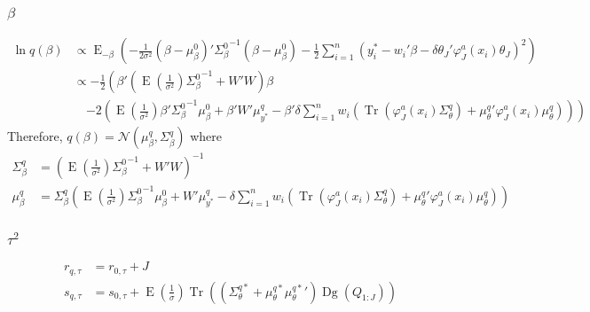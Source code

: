 \documentclass[11pt]{article}
\DeclareMathOperator{\Tr}{Tr}
\newcommand{\opn}{\operatorname}
\begin{document}
\subsubsection{$\beta$}
  \begin{align*}
    \ln q\left(\beta\right)&\propto \opn{E}_{-\beta}\left(-\frac{1}{2\sigma^{2}}\left(\beta-\mu_{\beta}^{0}\right)'{\Sigma_{\beta}^{0}}^{-1}\left(\beta-\mu_{\beta}^{0}\right)-\frac{1}{2}\sum_{i=1}^{n}\left(y_{i}^{*}-w_{i}'\beta -\delta\theta_{J}'\varphi_{J}^{a}\left(x_{i}\right)\theta_{J}\right)^{2} \right)\\
    &\propto -\frac{1}{2}\left(\beta'\left(\opn{E}\left(\frac{1}{\sigma^{2}}\right){\Sigma_{\beta}^{0}}^{-1} + W'W\right)\beta \right.\\
    &\quad  \left. -2\left(\opn{E}\left(\frac{1}{\sigma^{2}}\right)\beta'{\Sigma_{\beta}^{0}}^{-1}\mu_{\beta}^{0} +\beta'W'\mu_{y^{*}}^{q}-\beta'\delta\sum_{i=1}^{n}w_{i}\left(\Tr\left(\varphi_{J}^{a}\left(x_{i}\right)\Sigma_{\theta}^{q}\right)+{\mu_{\theta}^{q}}'\varphi_{J}^{a}\left(x_{i}\right)\mu_{\theta}^{q}\right)\right)\right)
  \end{align*}
Therefore, $q\left(\beta\right) = \mathcal{N}\left(\mu_{\beta}^{q}, \Sigma_{\beta}^{q}\right)$ where
\begin{align*}
  \Sigma_{\beta}^{q} &= \left(\opn{E}\left(\frac{1}{\sigma^{2}}\right){\Sigma_{\beta}^{0}}^{-1} + W'W\right)^{-1}\\
  \mu_{\beta}^{q} &= \Sigma_{\beta}^{q}\left(\opn{E}\left(\frac{1}{\sigma^{2}}\right) {\Sigma_{\beta}^{0}}^{-1}\mu_{\beta}^{0} +W'\mu_{y^{*}}^{q} -\delta\sum_{i=1}^{n}w_{i}\left(\Tr\left(\varphi_{J}^{a}\left(x_{i}\right)\Sigma_{\theta}^{q}\right) + {\mu_{\theta}^{q}}'\varphi_{J}^{a}\left(x_{i}\right)\mu_{\theta}^{q}\right)\right)
\end{align*}
\subsubsection{$\tau^{2}$}
  \begin{align*}
    r_{q,\tau} &= r_{0,\tau} + J\\
    s_{q,\tau} &= s_{0,\tau} + \opn{E}\left(\frac{1}{\sigma}\right)\Tr\left(\left(\Sigma_{\theta}^{q*} + \mu_{\theta}^{q*}{\mu_{\theta}^{q*}}'\right)\opn{Dg}\left(Q_{1:J}\right)\right)
  \end{align*}
\end{document}
